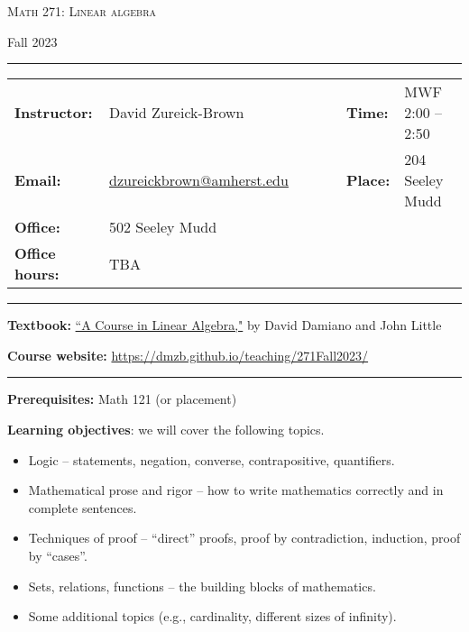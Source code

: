 \documentclass[12pt]{article}
\begin{document}
\begin{center}
{\Large \textsc{Math 271: Linear algebra}}
\end{center}
\begin{center}
Fall 2023
\end{center}


\begin{center}
\hrule
\begin{minipage}[t]{.75\textwidth}
\begin{tabular}{llcccll}
\textbf{Instructor:} & David Zureick-Brown & & &  & \textbf{Time:} & MWF 2:00 -- 2:50 \\
  \textbf{Email:} &  \href{mailto: dzureickbrown@amherst.edu}{dzureickbrown@amherst.edu} & & & & \textbf{Place:} & 204 Seeley Mudd \\
  \textbf{Office:} &  502 Seeley Mudd & & & &  & \\
  \textbf{Office hours:} &  TBA & & & &  & 
\end{tabular}
\end{minipage}
\hrule
\end{center}


\noindent\textbf{Textbook:}
\href{https://www.amazon.com/Course-Linear-Algebra-Dover-Mathematics/dp/0486469085}
{``A Course in Linear Algebra,"}  by David Damiano and John Little
\medskip

\noindent\textbf{Course website:} \url{https://dmzb.github.io/teaching/271Fall2023/}
\medskip

\hrule
\medskip

\noindent\textbf{Prerequisites:} Math 121 (or placement)
\smallskip


\noindent \textbf{Learning objectives}: we will cover the following topics.

\begin{itemize}
\item Logic -- statements, negation, converse, contrapositive, quantifiers. \vspace{-5pt}
\item Mathematical prose and rigor -- how to write mathematics
  correctly and in complete sentences.\vspace{-5pt}
\item Techniques of proof -- ``direct'' proofs, proof by contradiction, induction, proof by ``cases''. \vspace{-5pt}
\item Sets, relations, functions -- the building blocks of mathematics. \vspace{-5pt}
\item Some additional topics (e.g., cardinality, different sizes of infinity).
\end{itemize}
\end{document}
